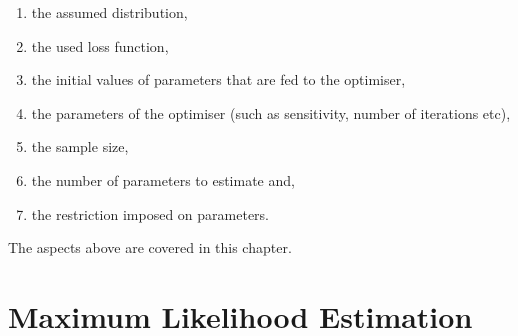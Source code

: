 \documentclass[
]{book}
\providecommand{\tightlist}{%
  \setlength{\itemsep}{0pt}\setlength{\parskip}{0pt}}
\theoremstyle{definition}
\theoremstyle{definition}
\theoremstyle{definition}
\theoremstyle{definition}
\theoremstyle{remark}
\begin{document}
\begin{enumerate}
\def\labelenumi{\arabic{enumi}.}
\tightlist
\item
  the assumed distribution,
\item
  the used loss function,
\item
  the initial values of parameters that are fed to the optimiser,
\item
  the parameters of the optimiser (such as sensitivity, number of iterations etc),
\item
  the sample size,
\item
  the number of parameters to estimate and,
\item
  the restriction imposed on parameters.
\end{enumerate}

The aspects above are covered in this chapter.

\hypertarget{ADAMETSEstimationLikelihood}{%
\section{Maximum Likelihood Estimation}\label{ADAMETSEstimationLikelihood}}
\end{document}
